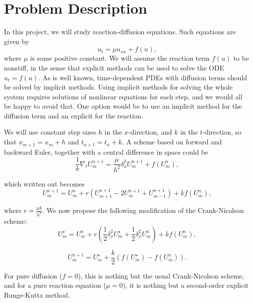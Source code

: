 \chapter{Problem Description}

In this project, we will study reaction-diffusion equations. Such equations are given by
\begin{equation}
    u_t = \mu u_{xx} + f(u),
\end{equation}
where $\mu$ is some positive constant. We will assume the reaction term $f(u)$ to be nonstiff, in the sense that explicit methods can be used to solve the ODE $u_t = f(u)$. As is well known, time-dependent PDEs with diffusion terms should be solved by implicit methods. Using implicit methods for solving the whole system requires solutions of nonlinear equations for each step, and we would all be happy to avoid that. One option would be to use an implicit method for the diffusion term and an explicit for the reaction.

We will use constant step sizes $h$ in the $x$-direction, and $k$ in the $t$-direction, so that $x_{m+1} = x_m + h$ and $t_{n+1} = t_n + k$. A scheme based on forward and backward Euler, together with a central difference in space could be
\begin{equation}
    \frac{1}{k} \nabla_t U_m^{n+1} = \frac{\mu}{h^2} \delta_x^2 U_m^{n+1} + f(U_m^n),
\end{equation}

which written out becomes
\begin{equation}
    U_m^{n+1} = U_m^n + r \left( U_{m+1}^{n+1} - 2 U_m^{n+1} + U_{m-1}^{n+1} \right) + k f(U_m^n),
\end{equation}

where $r = \frac{\mu k}{h^2}$. We now propose the following modification of the Crank-Nicolson scheme:
\begin{equation}
    U_m^\star = U_m^n + r \left( \frac{1}{2} \delta_x^2 U_m^\star + \frac{1}{2} \delta_x^2 U_m^n \right) + k f(U_m^n),
\end{equation}

\begin{equation}
    U_m^{n+1} = U_m^\star + \frac{k}{2} \left( f(U_m^\star) - f(U_m^n) \right).
\end{equation}

For pure diffusion ($f = 0$), this is nothing but the usual Crank-Nicolson scheme, and for a pure reaction equation ($\mu = 0$), it is nothing but a second-order explicit Runge-Kutta method.

